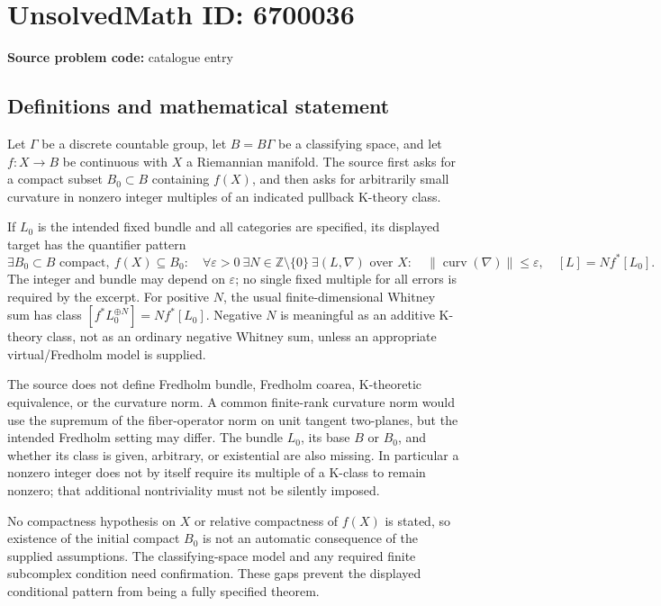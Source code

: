 \documentclass[11pt]{article}
\begin{document}
\section*{UnsolvedMath ID: 6700036}
\textbf{Source problem code:} catalogue entry
\subsection{Definitions and mathematical statement}
Let \(\Gamma\) be a discrete countable group, let \(B=B\Gamma\) be a classifying space, and let \(f:X\to B\) be continuous with \(X\) a Riemannian manifold. The source first asks for a compact subset \(B_0\subset B\) containing \(f(X)\), and then asks for arbitrarily small curvature in nonzero integer multiples of an indicated pullback K-theory class.

If \(L_0\) is the intended fixed bundle and all categories are specified, its displayed target has the quantifier pattern
\[
 \exists B_0\subset B\text{ compact},\ f(X)\subseteq B_0:\quad
 \forall\varepsilon>0\ \exists N\in\mathbb Z\setminus\{0\}\ 
 \exists(L,\nabla)\text{ over }X:
 \quad\|\operatorname{curv}(\nabla)\|\le\varepsilon,
 \quad [L]=Nf^*[L_0].
\]
The integer and bundle may depend on \(\varepsilon\); no single fixed multiple for all errors is required by the excerpt. For positive \(N\), the usual finite-dimensional Whitney sum has class \([f^*L_0^{\oplus N}]=Nf^*[L_0]\). Negative \(N\) is meaningful as an additive K-theory class, not as an ordinary negative Whitney sum, unless an appropriate virtual/Fredholm model is supplied.

The source does not define Fredholm bundle, Fredholm coarea, K-theoretic equivalence, or the curvature norm. A common finite-rank curvature norm would use the supremum of the fiber-operator norm on unit tangent two-planes, but the intended Fredholm setting may differ. The bundle \(L_0\), its base \(B\) or \(B_0\), and whether its class is given, arbitrary, or existential are also missing. In particular a nonzero integer does not by itself require its multiple of a K-class to remain nonzero; that additional nontriviality must not be silently imposed.

No compactness hypothesis on \(X\) or relative compactness of \(f(X)\) is stated, so existence of the initial compact \(B_0\) is not an automatic consequence of the supplied assumptions. The classifying-space model and any required finite subcomplex condition need confirmation. These gaps prevent the displayed conditional pattern from being a fully specified theorem.
\end{document}

